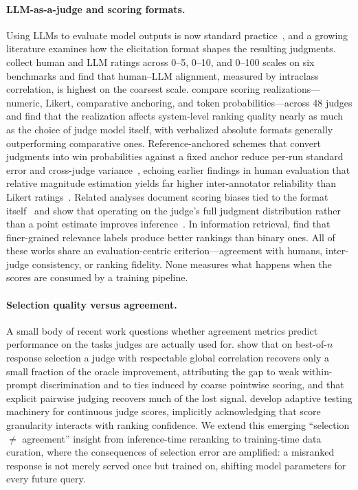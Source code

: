 \paragraph{LLM-as-a-judge and scoring formats.}
Using LLMs to evaluate model outputs is now standard
practice~\citep{zheng2023mtbench, liu2023geval}, and a growing literature
examines how the elicitation format shapes the resulting
judgments. \citet{li2025grading} collect human and LLM ratings across 0--5,
0--10, and 0--100 scales on six benchmarks and find that human--LLM
alignment, measured by intraclass correlation, is highest on the coarsest
scale. \citet{gera2025justrank} compare scoring realizations---numeric,
Likert, comparative anchoring, and token probabilities---across 48 judges
and find that the realization affects system-level ranking quality nearly
as much as the choice of judge model itself, with verbalized absolute
formats generally outperforming comparative ones. Reference-anchored
schemes that convert judgments into win probabilities against a fixed
anchor reduce per-run standard error and cross-judge
variance~\citep{raee2026}, echoing earlier findings in human evaluation
that relative magnitude estimation yields far higher inter-annotator
reliability than Likert ratings~\citep{novikova2018rankme}. Related
analyses document scoring biases tied to the format
itself~\citep{li2025scoringbias} and show that operating on the judge's
full judgment distribution rather than a point estimate improves
inference~\citep{wang2025judgmentdist}. In information retrieval,
\citet{zhuang2024beyond} find that finer-grained relevance labels produce
better rankings than binary ones. All of these works share an
evaluation-centric criterion---agreement with humans, inter-judge
consistency, or ranking fidelity. None measures what happens when the
scores are consumed by a training pipeline.

\paragraph{Selection quality versus agreement.}
A small body of recent work questions whether agreement metrics predict
performance on the tasks judges are actually used
for. \citet{landesberg2026} show that on best-of-$n$ response selection a
judge with respectable global correlation recovers only a small fraction
of the oracle improvement, attributing the gap to weak within-prompt
discrimination and to ties induced by coarse pointwise scoring, and that
explicit pairwise judging recovers much of the lost signal.
\citet{balkir2026adaptive} develop adaptive testing machinery for
continuous judge scores, implicitly acknowledging that score granularity
interacts with ranking confidence. We extend this emerging
``selection $\neq$ agreement'' insight from inference-time reranking to
training-time data curation, where the consequences of selection error are
amplified: a misranked response is not merely served once but trained on,
shifting model parameters for every future query.

